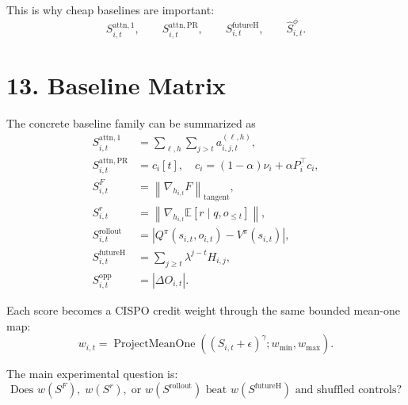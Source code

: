 \documentclass[11pt]{article}
\newcommand{\ProjectMeanOne}{\operatorname{ProjectMeanOne}}
\newcommand{\E}{\mathbb{E}}
\begin{document}
This is why cheap baselines are important:
\begin{equation}
  S^{\mathrm{attn},1}_{i,t},
  \qquad
  S^{\mathrm{attn},\mathrm{PR}}_{i,t},
  \qquad
  S^{\mathrm{futureH}}_{i,t},
  \qquad
  \hat S^\phi_{i,t}.
\end{equation}

\section*{13. Baseline Matrix}

The concrete baseline family can be summarized as
\begin{align}
  S^{\mathrm{attn},1}_{i,t}
  &=
  \sum_{\ell,h}
  \sum_{j>t}
  a^{(\ell,h)}_{i,j,t},
  \\
  S^{\mathrm{attn},\mathrm{PR}}_{i,t}
  &=
  c_i[t],
  \quad
  c_i=(1-\alpha)\nu_i+\alpha P_i^\top c_i,
  \\
  S^F_{i,t}
  &=
  \left\|
    \nabla_{h_{i,t}} F
  \right\|_{\mathrm{tangent}},
  \\
  S^r_{i,t}
  &=
  \left\|
    \nabla_{h_{i,t}}
    \E[r \mid q,o_{\le t}]
  \right\|,
  \\
  S^{\mathrm{rollout}}_{i,t}
  &=
  \left|
    Q^\pi(s_{i,t},o_{i,t})
    -
    V^\pi(s_{i,t})
  \right|,
  \\
  S^{\mathrm{futureH}}_{i,t}
  &=
  \sum_{j \ge t}
  \lambda^{j-t}
  H_{i,j},
  \\
  S^{\mathrm{opp}}_{i,t}
  &=
  \left|
    \Delta O_{i,t}
  \right|.
\end{align}

Each score becomes a CISPO credit weight through the same bounded mean-one map:
\begin{equation}
  w_{i,t}
  =
  \ProjectMeanOne
  \left(
    (S_{i,t}+\epsilon)^\gamma;
    w_{\min},
    w_{\max}
  \right).
\end{equation}

The main experimental question is:
\begin{equation}
  \text{Does } w(S^F),\; w(S^r),\; \text{or } w(S^{\mathrm{rollout}})
  \text{ beat }
  w(S^{\mathrm{futureH}})
  \text{ and shuffled controls?}
\end{equation}
\end{document}
